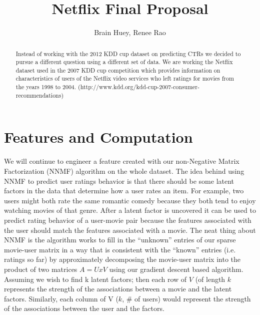 \documentclass[11pt]{article}
\title{Netflix Final Proposal}
\author{ Brain Huey, Renee Rao}
\date{}
\begin{document}
\maketitle

\begin{abstract}

Instead of working with the 2012 KDD cup dataset on predicting CTRs we
decided to pursue a different question using a different set of
data. We are working the Netflix dataset used in the 2007 KDD cup
competition which provides information on characteristics of users of
the Netflix video services who left ratings for movies from the years
1998 to
2004. (http://www.kdd.org/kdd-cup-2007-consumer-recommendations)

\end{abstract}

\section{Features and Computation}

We will continue to engineer a feature created with our non-Negative
Matrix Factorization (NNMF) algorithm on the whole dataset. The idea
behind using NNMF to predict user ratings behavior is that there
should be some latent factors in the data that determine how a user
rates an item. For example, two users might both rate the same
romantic comedy because they both tend to enjoy watching movies of
that genre. After a latent factor is uncovered it can be used to
predict rating behavior of a user-movie pair because the features
associated with the user should match the features associated with a
movie. The neat thing about NNMF is the algorithm works to fill in the
``unknown'' entries of our sparse movie-user matrix in a way that is
consistent with the ``known'' entries (i.e. ratings so far) by
approximately decomposing the movie-user matrix into the product of
two matrices $A = U x V$ using our gradient descent based
algorithm. Assuming we wish to find k latent factors; then each row of
$V$ (of length $k$ represents the strength of the associations between
a movie and the latent factors. Similarly, each column of V ($k$, \# of
users) would represent the strength of the associations between the
user and the factors.  
\end{document}
